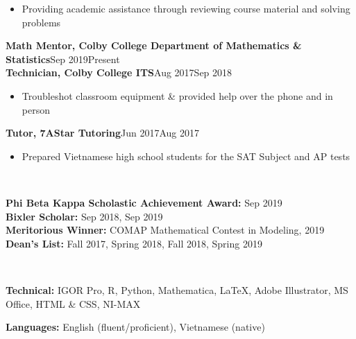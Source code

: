 \documentclass[letter, 9pt]{article}
\newcommand{\longunderline}[1]{\uline{#1\hfill\mbox{}}}
\begin{document}
	\begin{itemize}[noitemsep, nolistsep]
		\item Providing academic assistance through reviewing course material and solving problems
	\end{itemize}
	\textbf{Math Mentor, Colby College Department of Mathematics \& Statistics}\hfill Sep 2019\textemdash Present\\	  
	\noindent \textbf{Technician, Colby College ITS}\hfill Aug 2017\textemdash Sep 2018
	\begin{itemize}[noitemsep, nolistsep]
		\item Troubleshot classroom equipment \& provided help over the phone and in person
	\end{itemize}
	  \textbf{Tutor, 7AStar Tutoring}\hfill Jun 2017\textemdash Aug 2017
	\begin{itemize}[noitemsep, nolistsep]
		\item Prepared Vietnamese high school students for the SAT Subject and AP tests\\
	\end{itemize}

	\vspace{-7pt} \noindent \longunderline{\normalsize{{\color{colby}{\textbf{HONORS \& AWARDS}}}}}\\ \vspace{-7pt}
			
		\noindent \textbf{Phi Beta Kappa Scholastic Achievement Award:} Sep 2019 \\
		\noindent \textbf{Bixler Scholar:} Sep 2018, Sep 2019\\
		\noindent \textbf{Meritorious Winner:} {COMAP} Mathematical Contest in Modeling, 2019\\
		\noindent \textbf{Dean's List:} Fall 2017, Spring 2018, Fall 2018, Spring 2019\\
		 \vspace{-7pt}
	
	
	\noindent \longunderline{\normalsize{{}}}
	\\ \vspace{-7pt}
	
	\noindent \textbf{Technical:} IGOR Pro, R, Python, Mathematica, \LaTeX{}, Adobe Illustrator, MS Office,  HTML \& CSS, NI-MAX
	
	\noindent \textbf{Languages:} English (fluent/proficient), Vietnamese (native)\\
	\vspace{-7pt}
	
\end{document}
